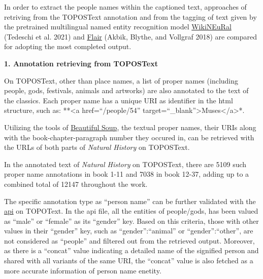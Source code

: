 \documentclass[
  12pt,
]{article}
\begin{document}
In order to extract the people names within the captioned text,
approaches of retriving from the TOPOSText annotation and from the
tagging of text given by the pretrained multilingual named entity
recognition model
\href{https://huggingface.co/Babelscape/wikineural-multilingual-ner}{WikiNEuRal}
(Tedeschi et al. 2021) and
\href{https://huggingface.co/flair/ner-english-ontonotes-fast}{Flair}
(Akbik, Blythe, and Vollgraf 2018) are compared for adopting the most
completed output.

\textbf{1. Annotation retrieving from TOPOSText}

On TOPOSText, other than place names, a list of proper names (including
people, gods, festivals, animals and artworks) are also annotated to the
text of the classics. Each proper name has a unique URI as identifier in
the html structure, such as: **\textless a href=``/people/54''
target=``\_blank''\textgreater Muses\textless/a\textgreater**.

Utilizing the tools of
\href{https://www.crummy.com/software/BeautifulSoup/bs4/doc/}{Beautiful
Soup}, the textual proper names, their URIs along with the
book-chapter-paragraph number they occured in, can be retrieved with the
URLs of both parts of \emph{Natural History} on TOPOSText.

In the annotated text of \emph{Natural History} on TOPOSText, there are
5109 such proper name annotations in book 1-11 and 7038 in book 12-37,
adding up to a combined total of 12147 throughout the work.

The specific annotation type as ``person name'' can be further validated
with the \href{https://topostext.org/api/people/readweb.php}{api} on
TOPOText. In the api file, all the entities of people/gods, has been
valued as ``male'' or ``female'' as its ``gender'' key. Based on this
criteria, those with other values in their ``gender'' key, such as
``gender'':``animal'' or ``gender'':``other'', are not considered as
``people'' and filtered out from the retrieved output. Moreover, as
there is a ``concat'' value indicating a detailed name of the signified
person and shared with all variants of the same URI, the ``concat''
value is also fetched as a more accurate information of person name
enetity.
\end{document}
